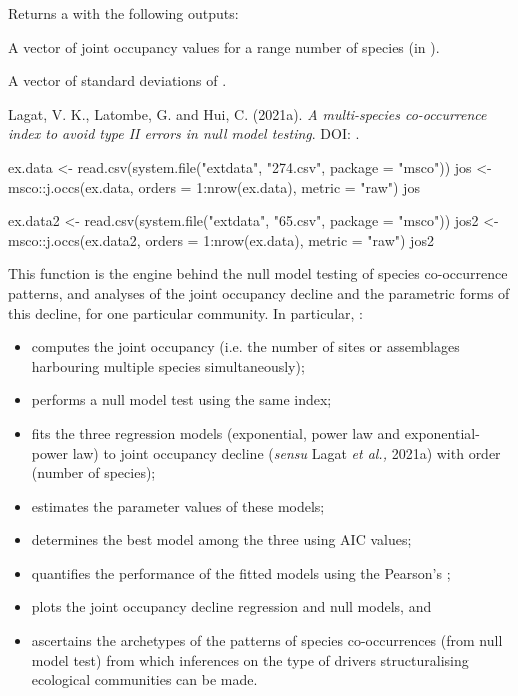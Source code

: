 \documentclass[a4paper]{book}
\begin{document}
%
\begin{Value}
Returns a  with the following outputs:
\begin{ldescription}
\item[\code{jo.vals}] A vector of joint occupancy values for a range number of species (in ).
\item[\code{jo.sds}] A vector of standard deviations of .
\end{ldescription}
\end{Value}
%
\begin{References}\relax
Lagat, V. K., Latombe, G. and Hui, C. (2021a). \emph{A multi-species co-occurrence
index to avoid type II errors in null model testing}. DOI: .
\end{References}
%
\begin{Examples}
\begin{ExampleCode}
ex.data <- read.csv(system.file("extdata", "274.csv", package = "msco"))
jos <- msco::j.occs(ex.data, orders = 1:nrow(ex.data), metric = "raw")
jos

ex.data2 <- read.csv(system.file("extdata", "65.csv", package = "msco"))
jos2 <- msco::j.occs(ex.data2, orders = 1:nrow(ex.data), metric = "raw")
jos2
\end{ExampleCode}
\end{Examples}
%
\begin{Description}\relax
This function is the engine behind the null model testing of species co-occurrence patterns,
and analyses of the joint occupancy decline and the parametric forms of this decline, for
one particular community. In particular, :
\begin{itemize}

\item{} computes the joint occupancy (i.e. the number of sites or assemblages
harbouring multiple species simultaneously);
\item{} performs a null model test using the same index;
\item{} fits the three regression models (exponential, power law and exponential-power law)
to joint occupancy decline (\emph{sensu} Lagat \emph{et al.,} 2021a) with order (number of species);
\item{} estimates the parameter values of these models;
\item{} determines the best model among the three using AIC values;
\item{} quantifies the performance of the fitted models using the Pearson's ;
\item{} plots the joint occupancy decline regression and null models, and
\item{} ascertains the archetypes of the patterns of species co-occurrences (from null
model test) from which inferences on the type of drivers structuralising ecological
communities can be made.

\end{itemize}

\end{Description}
\end{document}
